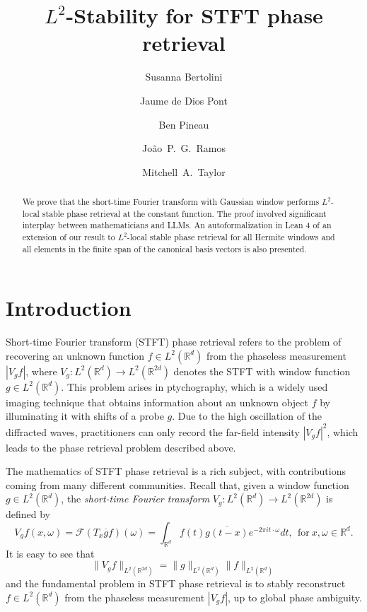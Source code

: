 \documentclass[11pt]{amsart}
\title{$L^2$-Stability for STFT phase retrieval}
\author{Susanna Bertolini}
\author{Jaume de Dios Pont}
\author{Ben Pineau}
\author{Jo\~ao~P.~G.\ Ramos}
\author{Mitchell~A.\ Taylor}
\theoremstyle{remark}
\begin{document}
\begin{abstract}
We prove that the short-time Fourier transform with Gaussian window performs $L^2$-local stable phase retrieval at the constant function. The proof involved significant interplay between mathematicians and LLMs. An autoformalization in Lean 4 of an extension of our result to $L^2$-local stable phase retrieval for all Hermite windows and all elements in the finite span of the canonical basis vectors is also presented. 
\end{abstract}

\maketitle

\section{Introduction}
Short-time Fourier transform (STFT) phase retrieval refers to the problem of recovering an unknown function $f\in L^2(\mathbb{R}^d)$ from the phaseless measurement $|V_gf|$, where $V_g:L^2(\mathbb{R}^d)\to L^2(\mathbb{R}^{2d})$ denotes the STFT with window function $g\in L^2(\mathbb{R}^d)$. This problem arises in ptychography, which is a widely used imaging technique that obtains information about an unknown object $f$ by illuminating it with shifts of a probe $g$. 
Due to the high oscillation of the diffracted waves, practitioners can only record the far-field intensity $|V_gf|^2$, which leads to the phase retrieval problem described above.
\medskip

The mathematics of STFT phase retrieval is a rich subject, with contributions coming from many different communities. Recall that, given a window function $g\in L^2(\mathbb{R}^d)$, the \emph{short-time Fourier transform} $V_g:L^2(\mathbb{R}^d)\to L^2(\mathbb{R}^{2d})$ is defined by
\begin{equation*}\label{STFT Def}
V_g f(x,\omega)=\mathcal{F}(T_x\overline{g}f) (\omega)=\int_{\mathbb{R}^d} f(t)\overline{g(t-x)}e^{-2\pi it\cdot \omega}dt, \ \ \text{for}\ x,\omega\in \mathbb{R}^d.
\end{equation*}
It is easy to see that 
\begin{equation}\label{isometry}
    \|V_g f\|_{L^2(\mathbb{R}^{2d})}=\|g\|_{L^2(\mathbb{R}^{d})} \|f\|_{L^2(\mathbb{R}^{d})}
\end{equation} and the fundamental problem in STFT phase retrieval is to stably reconstruct $f\in L^2(\mathbb{R}^d)$ from the phaseless measurement $|V_g f|$, up to global phase ambiguity. \medskip
\end{document}
